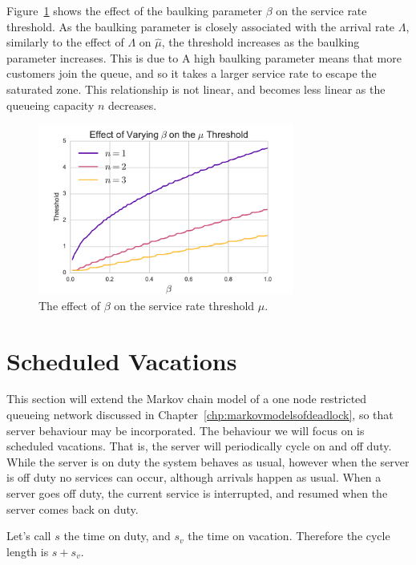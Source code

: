 \documentclass{article}
\begin{document}
Figure~\ref{fig:betathreshold} shows the effect of the baulking parameter $\beta$ on the service rate threshold.
As the baulking parameter is closely associated with the arrival rate $\Lambda$, similarly to the effect of $\Lambda$ on $\hat{\mu}$, the threshold increases as the baulking parameter increases.
This is due to A high baulking parameter means that more customers join the queue, and so it takes a larger service rate to escape the saturated zone.
This relationship is not linear, and becomes less linear as the queueing capacity $n$ decreases.

\begin{figure}[!htbp]
  \begin{center}
    \includegraphics[width=0.75\textwidth]{img/thresholdbeta_plot}
  \end{center}
  \caption{The effect of $\beta$ on the service rate threshold $\hat{\mu}$.}
  \label{fig:betathreshold}
\end{figure}



\section{Scheduled Vacations}

This section will extend the Markov chain model of a one node restricted queueing network discussed in Chapter~\ref{chp:markovmodelsofdeadlock}, so that server behaviour may be incorporated.
The behaviour we will focus on is scheduled vacations.
That is, the server will periodically cycle on and off duty.
While the server is on duty the system behaves as usual, however when the server is off duty no services can occur, although arrivals happen as usual.
When a server goes off duty, the current service is interrupted, and resumed when the server comes back on duty.

Let’s call $s$ the time on duty, and $s_v$ the time on vacation.
Therefore the cycle length is $s + s_v$.
\end{document}
